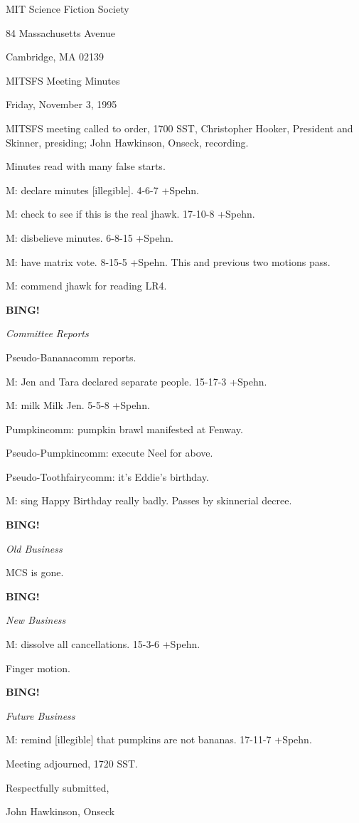 \documentclass[12pt]{article}
\newcommand{\bing}{{\bf BING!} }
\newcommand{\goto}[1]{\bing \vskip 12pt \centerline{{\em{#1}}}}
\begin{document}
\begin{center}

MIT Science Fiction Society 

84 Massachusetts Avenue

Cambridge, MA 02139

\vspace{12pt}

MITSFS Meeting Minutes 

Friday, November 3, 1995

\end{center}
 
\vspace{18pt}

\setlength{\parskip}{6pt}

\noindent
MITSFS meeting called to order, 1700 SST,
Christopher Hooker, President and Skinner, presiding; John Hawkinson, Onseck, recording.

Minutes read with many false starts.

M: declare minutes [illegible]. 4-6-7 +Spehn.

M: check to see if this is the real jhawk. 17-10-8 +Spehn.

M: disbelieve minutes. 6-8-15 +Spehn.

M: have matrix vote. 8-15-5 +Spehn. This and previous two motions pass.

M: commend jhawk for reading LR4.

\goto{Committee Reports}

Pseudo-Bananacomm reports.

M: Jen and Tara declared separate people. 15-17-3 +Spehn.

M: milk Milk Jen. 5-5-8 +Spehn.

Pumpkincomm: pumpkin brawl manifested at Fenway.

Pseudo-Pumpkincomm: execute Neel for above.

Pseudo-Toothfairycomm: it's Eddie's birthday.

M: sing Happy Birthday really badly. Passes by skinnerial decree.

\goto{Old Business}

MCS is gone.

\goto{New Business}

M: dissolve all cancellations. 15-3-6 +Spehn.

Finger motion.

\goto{Future Business}

M: remind [illegible] that pumpkins are not bananas. 17-11-7 +Spehn.

\vspace{12pt}

\noindent
Meeting adjourned, 1720 SST.

\vspace{18pt}

\centerline{Respectfully submitted,}
\centerline{John Hawkinson, Onseck}
\end{document}
